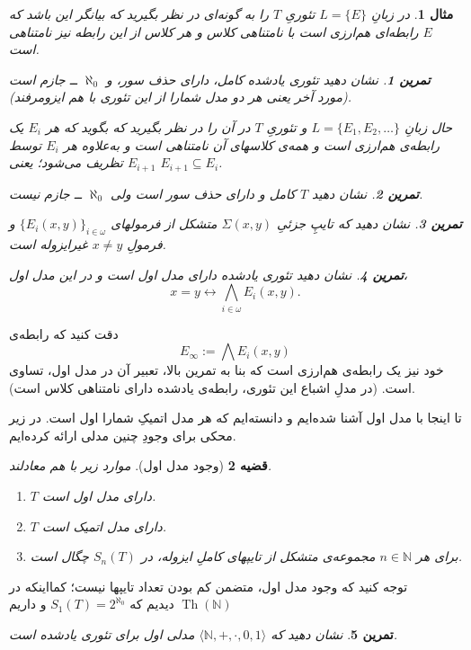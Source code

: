 \documentclass[12pt,a4paper]{report}
\theoremstyle{colorhead}
\newtheorem{thm}{قضیه}
\newtheorem{tam}{تمرین}
\newtheorem{mesal}[thm]{مثال}
\DeclareMathOperator{\Th}{Th}
\begin{document}
\begin{mesal}
در زبانِ
$L=\{E\}$
تئوریِ
$T$
را به گونه‌ای در نظر بگیرید که بیانگر این  باشد که
$E$
رابطه‌ای هم‌ارزی است با نامتناهی کلاس و هر کلاس از این رابطه نیز نامتناهی است.
\begin{tam}
نشان دهید تئوری یادشده کامل، دارای حذف سور، و 
$\aleph_0$
ــ‌ جازم است (مورد آخر یعنی هر دو مدل شمارا از این تئوری با هم ایزومرفند).
\end{tam}
حال زبانِ
$L=\{E_1,E_2,\ldots\}$
و تئوریِ
$T$
در آن را در نظر بگیرید که بگوید که
هر
$E_i$
یک رابطه‌ی هم‌ارزی است و همه‌ی کلاسهای آن نامتناهی است و به‌علاوه 
هر
$E_i$
توسط
$E_{i+1}$
تظریف می‌شود؛ یعنی
$E_{i+1}\subseteq E_i$.
\begin{tam}
نشان دهید
$T$
کامل و دارای حذف سور است ولی
$\aleph_0$  ــ‌
جازم نیست.
\end{tam}
\begin{tam}
نشان دهید که
تایپِ جزئیِ
$\Sigma(x,y)$
متشکل از فرمولهای
$\{E_i(x,y)\}_{i\in \omega}$
و فرمولِ
$x\not=y$
غیرایزوله است.
\end{tam}
\begin{tam}
نشان دهید تئوری یادشده دارای مدل اول است و در این مدل اول،
\[
x=y\leftrightarrow \bigwedge_{i\in \omega} E_i(x,y).\]
\end{tam}
\end{mesal}
دقت کنید که رابطه‌ی
\[
E_\infty:=\bigwedge E_i(x,y)
\]
خود نیز یک رابطه‌ی هم‌ارزی است که بنا به تمرین بالا، تعبیر آن در مدل اول، تساوی است. (در مدلِ اشباع این تئوری، رابطه‌ی
یادشده دارای نامتناهی کلاس است).
\par 
تا اینجا با مدل اول آشنا شده‌ایم و دانسته‌ایم که هر مدل اتمیکِ شمارا اول است. در زیر محکی برای
وجودِ چنین مدلی ارائه کرده‌ایم.
\begin{thm}[وجود مدل اول]
موارد زیر با هم معادلند.
\begin{enumerate}
\item 
$T$
دارای مدل اول است.
\item 
$T$
دارای مدل اتمیک است.
\item 
برای هر
$n\in \mathbb{N}$
مجموعه‌ی متشکل از تایپهای کاملِ
ایزوله، در
$S_n(T)$
چگال است. 
\end{enumerate}
\end{thm}
توجه کنید که وجود مدل اول، متضمن کم بودن تعداد تایپها نیست؛ کمااینکه در
$\Th(\mathbb{N})$
دیدیم که 
$S_1(T)=2^{\aleph_0}$
و داریم
\begin{tam}
نشان دهید که 
$\langle \mathbb{N},+,\cdot,0,1\rangle$
مدلی اول برای تئوری یادشده است. 
\end{tam}
\pagebreak
\end{document}

